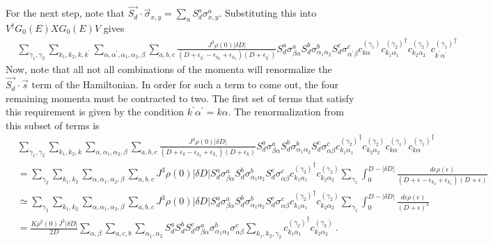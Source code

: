 For the next step, note that \(\vec{S_d}\cdot\vec{\sigma}_{x,y} = \sum_{a}S_d^a \sigma^a_{x,y}\). Substituting this into \(V^\dagger G_0(E)XG_0(E)V\) gives
\begin{equation}\begin{aligned}
	&\sum_{\gamma_1,\gamma_2}\sum_{k_1,k_2,k,k^\prime}\sum_{\alpha,\alpha^\prime,\alpha_1,\alpha_2,\beta} \sum_{a,b,c}\frac{J^3\rho(0) |\delta D|}{\left(D + \epsilon_{k^\prime} - \epsilon_{k_2} + \epsilon_{k_1}\right)\left(D + \epsilon_{k^\prime}\right)} S_d^a\sigma^a_{\beta \alpha}S_d^b\sigma^b_{\alpha_1 \alpha_2}S_d^c \sigma^c_{\alpha^\prime \beta} c^{(\gamma_1)}_{k\alpha}{c^{(\gamma_2)}_{k_1 \alpha_1}}^\dagger c^{(\gamma_2)}_{k_2 \alpha_2} {c^{(\gamma_1)}_{k^\prime\alpha^\prime}}^\dagger
\end{aligned}\end{equation}
Now, note that all not all combinations of the momenta will renormalize the \(\vec{S_d}\cdot\vec{s}\) term of the Hamiltonian. In order for such a term to come out, the four remaining momenta must be contracted to two. The first set of terms that satisfy this requirement is given by the condition  \(k^\prime\alpha^\prime = k\alpha\). The renormalization from this subset of terms is
\begin{equation}\begin{aligned}
&\sum_{\gamma_1,\gamma_2}\sum_{k_1,k_2,k}\sum_{\alpha,\alpha_1,\alpha_2,\beta} \sum_{a,b,c}\frac{J^3\rho(0) |\delta D|}{\left(D + \epsilon_k - \epsilon_{k_2} + \epsilon_{k_1}\right)\left(D + \epsilon_k\right)} S_d^a\sigma^a_{\beta \alpha}S_d^b\sigma^b_{\alpha_1 \alpha_2}S_d^c \sigma^c_{\alpha \beta} {c^{(\gamma_2)}_{k_1 \alpha_1}}^\dagger c^{(\gamma_2)}_{k_2 \alpha_2}c^{(\gamma_1)}_{k\alpha}{c^{(\gamma_1)}_{k\alpha}}^\dagger \\
&=\sum_{\gamma_2}\sum_{k_1,k_2}\sum_{\alpha,\alpha_1,\alpha_2,\beta} \sum_{a,b,c} J^3\rho(0) |\delta D| S_d^a\sigma^a_{\beta \alpha}S_d^b\sigma^b_{\alpha_1 \alpha_2}S_d^c\sigma^c_{\alpha \beta}{c^{(\gamma_2)}_{k_1 \alpha_1}}^\dagger c^{(\gamma_2)}_{k_2 \alpha_2} \sum_{\gamma_1}\int_{0}^{D - |\delta D|}\frac{ d\epsilon\rho(\epsilon) }{\left(D + \epsilon - \epsilon_{k_2} + \epsilon_{k_1}\right)\left(D + \epsilon\right)}\\
&\simeq\sum_{\gamma_2}\sum_{k_1,k_2}\sum_{\alpha,\alpha_1,\alpha_2,\beta} \sum_{a,b,c} J^3\rho(0) |\delta D| S_d^a\sigma^a_{\beta \alpha}S_d^b\sigma^b_{\alpha_1 \alpha_2}S_d^c\sigma^c_{\alpha \beta}{c^{(\gamma_2)}_{k_1 \alpha_1}}^\dagger c^{(\gamma_2)}_{k_2 \alpha_2} \sum_{\gamma_1}\int_{0}^{D - |\delta D|}\frac{ d\epsilon\rho(\epsilon) }{\left(D + \epsilon\right)^2}\\
&=\frac{K \rho^2(0) J^3|\delta D|}{2D} \sum_{\alpha,\beta} \sum_{a,c,b}\sum_{\alpha_1,\alpha_2}S_d^a S_d^b S_d^c\sigma^a_{\beta \alpha} \sigma^b_{\alpha_1 \alpha_2} \sigma^c_{\alpha \beta} \sum_{k_1,k_2,\gamma_2}{c^{(\gamma_2)}_{k_1 \alpha_1}}^\dagger c^{(\gamma_2)}_{k_2 \alpha_2}~.\\
\end{aligned}\end{equation}
